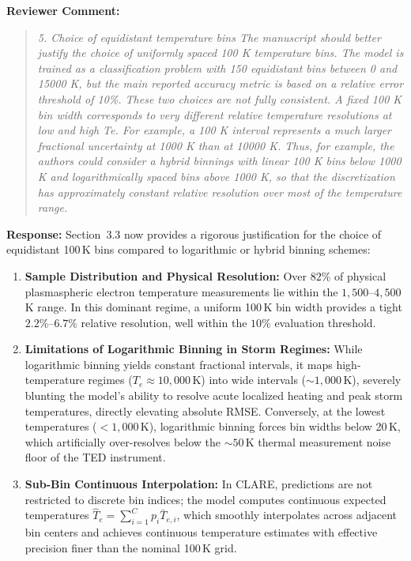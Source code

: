 \documentclass[a4paper,12pt]{article}
\newcommand{\reviewercomment}[1]{%
  \begin{samepage}%
  \par\noindent\textbf{Reviewer Comment:}\par
  \begin{quote}\itshape #1\end{quote}}
\newcommand{\filledresponse}[1]{%
  \par\noindent\textbf{Response:} #1\par
  \vspace{0.4cm}%
  \end{samepage}}
\begin{document}
\reviewercomment{5. Choice of equidistant temperature bins The manuscript should better justify the choice of
uniformly spaced 100 K temperature bins. The model is trained as a classification problem with 150
equidistant bins between 0 and 15000 K, but the main reported accuracy metric is based on a relative
error threshold of 10\%. These two choices are not fully consistent. A fixed 100 K bin width
corresponds to very different relative temperature resolutions at low and high Te. For example, a
100 K interval represents a much larger fractional uncertainty at 1000 K than at 10000 K. Thus, for
example, the authors could consider a hybrid binnings with linear 100 K bins below 1000 K and
logarithmically spaced bins above 1000 K, so that the discretization has approximately constant
relative resolution over most of the temperature range.}
\filledresponse{Section~3.3 now provides a rigorous justification for the choice of equidistant 100\,K bins compared to logarithmic or hybrid binning schemes:
\begin{enumerate}
    \item \textbf{Sample Distribution and Physical Resolution:} Over $82\%$ of physical plasmaspheric electron temperature measurements lie within the $1{,}500$--$4{,}500$\,K range. In this dominant regime, a uniform 100\,K bin width provides a tight $2.2\%$--$6.7\%$ relative resolution, well within the $10\%$ evaluation threshold.
    \item \textbf{Limitations of Logarithmic Binning in Storm Regimes:} While logarithmic binning yields constant fractional intervals, it maps high-temperature regimes ($T_e \approx 10{,}000$\,K) into wide intervals ($\sim 1{,}000$\,K), severely blunting the model's ability to resolve acute localized heating and peak storm temperatures, directly elevating absolute RMSE. Conversely, at the lowest temperatures ($< 1{,}000$\,K), logarithmic binning forces bin widths below 20\,K, which artificially over-resolves below the $\sim 50$\,K thermal measurement noise floor of the TED instrument.
    \item \textbf{Sub-Bin Continuous Interpolation:} In CLARE, predictions are not restricted to discrete bin indices; the model computes continuous expected temperatures $\hat{T}_e = \sum_{i=1}^C p_i \bar{T}_{e,i}$, which smoothly interpolates across adjacent bin centers and achieves continuous temperature estimates with effective precision finer than the nominal 100\,K grid.
\end{enumerate}}
\end{document}
